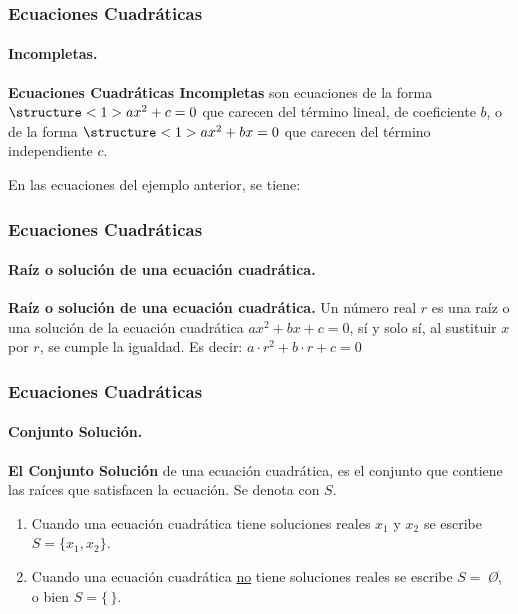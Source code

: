 \documentclass[mathserif]{beamer}
\begin{document}
\begin{frame} 
\frametitle{\bf Ecuaciones Cuadráticas} 
\framesubtitle{Incompletas.} 

\vspace{-0.75mm}
\begin{definicion}[II]
{\bf Ecuaciones Cuadráticas Incompletas} son ecuaciones de la forma $\structure<1>{ax^2+c=0}$ que carecen del término lineal, de coeficiente $b$, o de la forma $\structure<1>{ax^2+bx=0}$ que carecen del término independiente $c$.
\end{definicion}

\pause
En las ecuaciones del ejemplo anterior, se tiene: \vp
\pause
{}
\end{frame}

\begin{frame} 
\frametitle{\bf Ecuaciones Cuadráticas} 
\framesubtitle{Raíz o solución de una ecuación cuadrática.} 

\begin{definicion}[III]
{\bf Raíz o solución de una ecuación cuadrática.} Un número real $r$ es una raíz o una solución de la ecuación cuadrática $ax^2+bx+c=0$, sí y
solo sí, al sustituir $x$ por $r$, se cumple la igualdad. Es decir: $a\cdot r^2+b\cdot r+c=0$
\end{definicion}
\end{frame}

\begin{frame} 
\frametitle{Ecuaciones Cuadráticas} 
\framesubtitle{Conjunto Solución.} 

\begin{definicion}[IV]
{\bf El Conjunto Solución} de una ecuación cuadrática, es el conjunto que contiene las raíces que satisfacen la ecuación. Se denota con $S$. 
\end{definicion}

\pause
\begin{enumerate} 
\item<2-| alert@2> Cuando una ecuación cuadrática tiene soluciones reales $x_1$ y $x_2$ se escribe $S=\{x_1,x_2\}$. 
\item<3-| alert@3> Cuando una ecuación cuadrática \underline{no} tiene soluciones reales se escribe $S=$\,\textit\O,\,\, o bien $S=\{\,\}$.
\pause
\end{enumerate}
\end{frame}
\end{document}
